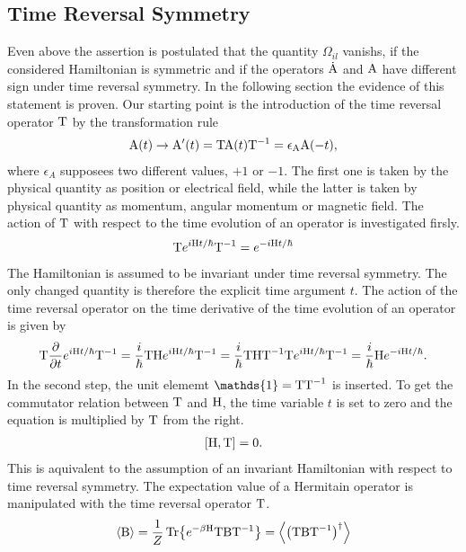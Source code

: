 \subsection{Time Reversal Symmetry}
\label{subsec: time reversal symmetry}
%
%
Even above the assertion is postulated that the quantity $\Omega_{il}$ vanishs, if the considered Hamiltonian is symmetric and if the operators $\dot{\mathrm{A}}$ and $\mathrm{A}$ have different sign under time reversal symmetry.
In the following section the evidence of this statement is proven.
Our starting point is the introduction of the time reversal operator $\mathrm{T}$ by the transformation rule
%
\begin{align}
	\mathrm{A}(t) \to \mathrm{A}'(t) = \mathrm{T} \mathrm{A}(t) \mathrm{T}^{-1} = \epsilon_{\mathrm{A}} \mathrm{A}(-t),
\end{align}
%
where $\epsilon_{A}$ supposees two different values, $+1$ or $-1$.
The first one is taken by the physical quantity as position or electrical field, while the latter is taken by physical quantity as momentum, angular momentum or magnetic field.
The action of $\mathrm{T}$ with respect to the time evolution of an operator is investigated firsly.
%
\begin{align}
	\mathrm{T} e^{i\mathrm{H}t/\hbar} \mathrm{T}^{-1} = e^{-i\mathrm{H}t/\hbar}
\end{align}
%
The Hamiltonian is assumed to be invariant under time reversal symmetry.
The only changed quantity is therefore the explicit time argument $t$.
The action of the time reversal operator on the time derivative of the time evolution of an operator is given by
%
\begin{align}
	\mathrm{T} \pdv{t} e^{i\mathrm{H}t/\hbar} \mathrm{T}^{-1} = \frac{i}{\hbar} \mathrm{TH} e^{i\mathrm{H}t/\hbar} \mathrm{T}^{-1} = \frac{i}{\hbar} \mathrm{THT}^{-1} \mathrm{T} e^{i\mathrm{H}t/\hbar} \mathrm{T}^{-1} = \frac{i}{\hbar} \mathrm{H} e^{-i\mathrm{H}t/\hbar}.
\end{align}
%
In the second step, the unit elememt $\mathds{1} = \mt{TT}^{-1}$ is inserted.
To get the commutator relation between $\mathrm{T}$ and $\mathrm{H}$, the time variable $t$ is set to zero and the equation is multiplied by $\mathrm{T}$ from the right.
%
\begin{align}	
	\comm{\mt{H}}{\mt{T}} = 0.
\end{align}
%
This is aquivalent to the assumption of an invariant Hamiltonian with respect to time reversal symmetry.
The expectation value of a Hermitain operator is manipulated with the time reversal operator $\mathrm{T}$.
%
\begin{align}
	\expval{\mathrm{B}} = \frac{1}{Z} \Tr{e^{-\beta \mathrm{H}} \mathrm{T} \mathrm{B} \mathrm{T}^{-1}} = \expval{\big(\mathrm{TBT}^{-1}\big)^{\dag}}
	\label{eq:time reversal expectation value}
\end{align}

